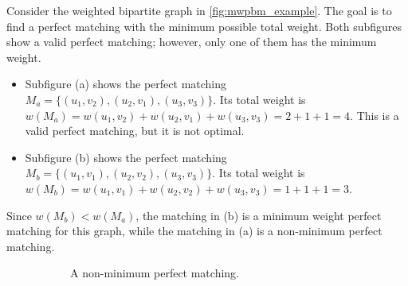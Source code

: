 \begin{example}
    Consider the weighted bipartite graph in \cref{fig:mwpbm_example}. The goal is to find a perfect matching with the minimum possible total weight. Both subfigures show a valid perfect matching; however, only one of them has the minimum weight.
    \begin{itemize}
        \item Subfigure (a) shows the perfect matching $M_a = \{(u_1, v_2), (u_2, v_1), (u_3, v_3)\}$. Its total weight is $w(M_a) = w(u_1, v_2) + w(u_2, v_1) + w(u_3, v_3) = 2 + 1 + 1 = 4$. This is a valid perfect matching, but it is not optimal.
        \item Subfigure (b) shows the perfect matching $M_b = \{(u_1, v_1), (u_2, v_2), (u_3, v_3)\}$. Its total weight is $w(M_b) = w(u_1, v_1) + w(u_2, v_2) + w(u_3, v_3) = 1 + 1 + 1 = 3$.
    \end{itemize}
    Since $w(M_b) < w(M_a)$, the matching in (b) is a minimum weight perfect matching for this graph, while the matching in (a) is a non-minimum perfect matching.
    \begin{figure}[H]
        \centering
        \begin{subfigure}[b]{0.45\textwidth}
            \centering
            \caption{A non-minimum perfect matching.}
            \label{fig:mwpbm_non_perfect}
        \end{subfigure}
        \hfill
        \begin{subfigure}[b]{0.45\textwidth}
            \centering
            \begin{tikzpicture}[node distance={15mm}, thick, auto=center, main/.style = {draw, circle}]

\end{tikzpicture}
\end{subfigure}
\end{figure}
\end{example}
